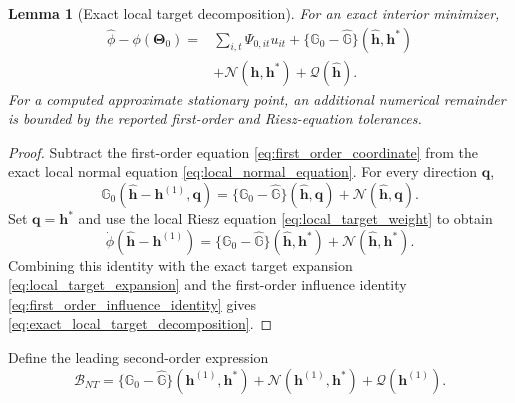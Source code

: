 \documentclass[11pt]{article}
\numberwithin{equation}{section}
\newtheorem{lemma}{Lemma}
\theoremstyle{remark}
\newcommand{\bTheta}{\bm\Theta}
\begin{document}
\begin{lemma}[Exact local target decomposition]
\label{lem:exact_target_decomposition}
For an exact interior minimizer,
\begin{align}
\widehat\phi-\phi(\bTheta_0)
={}&
\sum_{i,t}\Psi_{0,it}u_{it}
+
\{\mathbb G_0-\widehat{\mathbb G}\}
(\widehat{\bm h},\bm h^*)
\nonumber\\
&+
\mathcal N(\widehat{\bm h},\bm h^*)
+
\mathcal Q(\widehat{\bm h}).
\label{eq:exact_local_target_decomposition}
\end{align}
For a computed approximate stationary point, an additional numerical remainder is bounded by the reported first-order and Riesz-equation tolerances.
\end{lemma}

\begin{proof}
Subtract the first-order equation \eqref{eq:first_order_coordinate} from the exact local normal equation \eqref{eq:local_normal_equation}. For every direction $\bm q$,
$$
\mathbb G_0(\widehat{\bm h}-\bm h^{(1)},\bm q)
=
\{\mathbb G_0-\widehat{\mathbb G}\}
(\widehat{\bm h},\bm q)
+
\mathcal N(\widehat{\bm h},\bm q).
$$
Set $\bm q=\bm h^*$ and use the local Riesz equation \eqref{eq:local_target_weight} to obtain
$$
\dot\phi(\widehat{\bm h}-\bm h^{(1)})
=
\{\mathbb G_0-\widehat{\mathbb G}\}
(\widehat{\bm h},\bm h^*)
+
\mathcal N(\widehat{\bm h},\bm h^*).
$$
Combining this identity with the exact target expansion \eqref{eq:local_target_expansion} and the first-order influence identity \eqref{eq:first_order_influence_identity} gives \eqref{eq:exact_local_target_decomposition}.
\end{proof}

Define the leading second-order expression
\begin{equation}
\label{eq:leading_second_order_term}
\mathcal B_{NT}
=
\{\mathbb G_0-\widehat{\mathbb G}\}
(\bm h^{(1)},\bm h^*)
+
\mathcal N(\bm h^{(1)},\bm h^*)
+
\mathcal Q(\bm h^{(1)}).
\end{equation}
\end{document}
